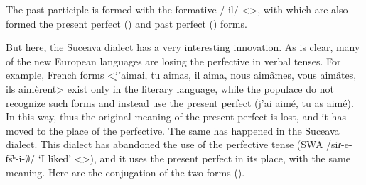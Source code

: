 

The past participle is formed with the formative /-il/ <>, with which are also formed the present perfect () and past perfect () forms. 


But here, the Suceava dialect has a very interesting innovation. As is clear, many of the new European languages are losing the perfective in verbal tenses. For example, French forms <j'aimai, tu aimas, il aima, nous aimâmes, vous aimâtes, ils aimèrent> exist only in the literary language, while the populace do not recognize such forms and instead use the present perfect (j'ai aimé, tu as aimé). In this way, thus the original meaning of the present perfect is lost, and it has moved to the place of the perfective. The same has happened in the Suceava dialect. This dialect has abandoned the use of the perfective tense (SWA /siɾ-e-t͡sʰ-i-$\emptyset$/ `I liked' <>), and it uses the present perfect in its place, with the same meaning. Here are the conjugation of the two forms ().

